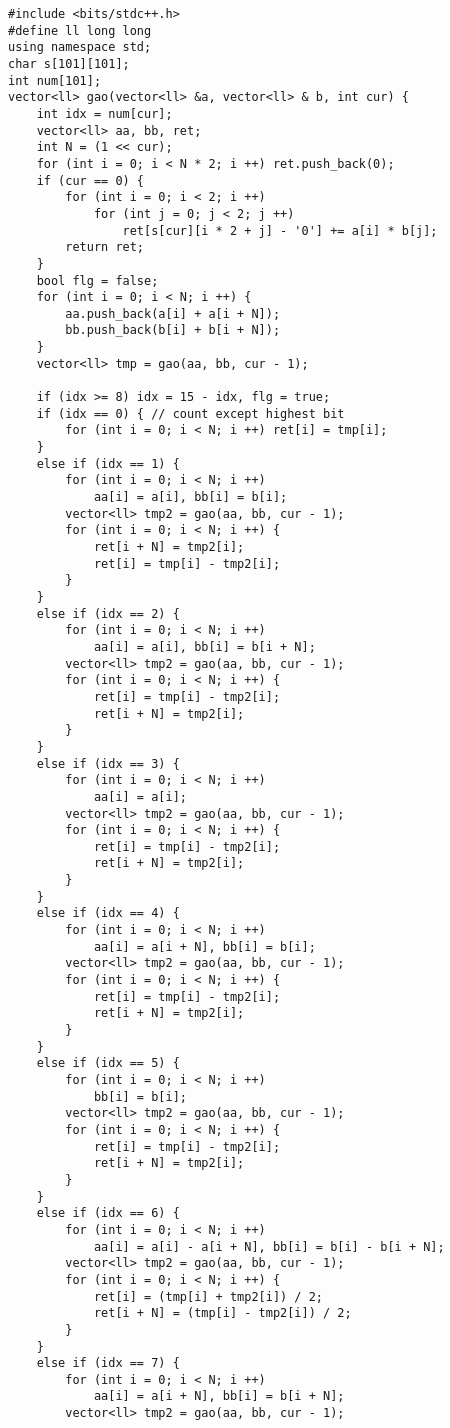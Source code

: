 \documentclass[UTF8]{ctexart}
\begin{document}
\begin{framed}
\begin{lstlisting}
#include <bits/stdc++.h>
#define ll long long
using namespace std;
char s[101][101];
int num[101];
vector<ll> gao(vector<ll> &a, vector<ll> & b, int cur) {
    int idx = num[cur];
    vector<ll> aa, bb, ret;
    int N = (1 << cur);
    for (int i = 0; i < N * 2; i ++) ret.push_back(0);
    if (cur == 0) {
        for (int i = 0; i < 2; i ++)
            for (int j = 0; j < 2; j ++)
                ret[s[cur][i * 2 + j] - '0'] += a[i] * b[j];
        return ret;
    }
    bool flg = false;
    for (int i = 0; i < N; i ++) {
        aa.push_back(a[i] + a[i + N]);
        bb.push_back(b[i] + b[i + N]);
    }
    vector<ll> tmp = gao(aa, bb, cur - 1);
 
    if (idx >= 8) idx = 15 - idx, flg = true;
    if (idx == 0) { // count except highest bit
        for (int i = 0; i < N; i ++) ret[i] = tmp[i];
    }
    else if (idx == 1) { 
        for (int i = 0; i < N; i ++)
            aa[i] = a[i], bb[i] = b[i];
        vector<ll> tmp2 = gao(aa, bb, cur - 1);
        for (int i = 0; i < N; i ++) {
            ret[i + N] = tmp2[i];
            ret[i] = tmp[i] - tmp2[i];
        }
    }
    else if (idx == 2) {
        for (int i = 0; i < N; i ++)
            aa[i] = a[i], bb[i] = b[i + N];
        vector<ll> tmp2 = gao(aa, bb, cur - 1);
        for (int i = 0; i < N; i ++) {
            ret[i] = tmp[i] - tmp2[i];
            ret[i + N] = tmp2[i];
        }
    }
    else if (idx == 3) {
        for (int i = 0; i < N; i ++)
            aa[i] = a[i];
        vector<ll> tmp2 = gao(aa, bb, cur - 1);
        for (int i = 0; i < N; i ++) {
            ret[i] = tmp[i] - tmp2[i];
            ret[i + N] = tmp2[i];
        }
    }
    else if (idx == 4) {
        for (int i = 0; i < N; i ++)
            aa[i] = a[i + N], bb[i] = b[i];
        vector<ll> tmp2 = gao(aa, bb, cur - 1);
        for (int i = 0; i < N; i ++) {
            ret[i] = tmp[i] - tmp2[i];
            ret[i + N] = tmp2[i];
        }
    }
    else if (idx == 5) {
        for (int i = 0; i < N; i ++)
            bb[i] = b[i];
        vector<ll> tmp2 = gao(aa, bb, cur - 1);
        for (int i = 0; i < N; i ++) {
            ret[i] = tmp[i] - tmp2[i];
            ret[i + N] = tmp2[i];
        }
    }
    else if (idx == 6) {
        for (int i = 0; i < N; i ++)
            aa[i] = a[i] - a[i + N], bb[i] = b[i] - b[i + N];
        vector<ll> tmp2 = gao(aa, bb, cur - 1);
        for (int i = 0; i < N; i ++) {
            ret[i] = (tmp[i] + tmp2[i]) / 2;
            ret[i + N] = (tmp[i] - tmp2[i]) / 2;
        }
    }
    else if (idx == 7) {
        for (int i = 0; i < N; i ++)
            aa[i] = a[i + N], bb[i] = b[i + N];
        vector<ll> tmp2 = gao(aa, bb, cur - 1);
 

\end{lstlisting}
\end{framed}
\end{document}
